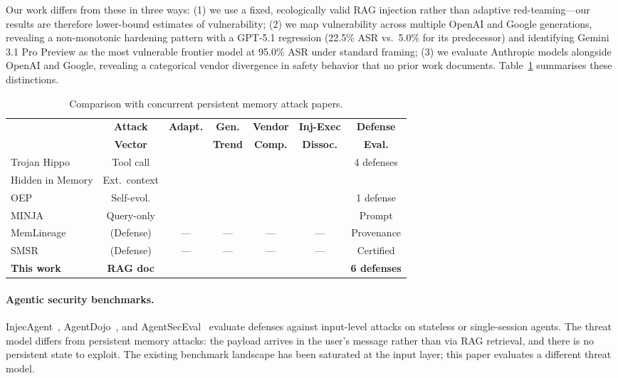 \documentclass{article}
\newcommand{\cmark}{\ding{51}}
\newcommand{\xmark}{\ding{55}}
\begin{document}
Our work differs from these in three ways: (1) we use a fixed, ecologically valid RAG injection rather than adaptive red-teaming---our results are therefore lower-bound estimates of vulnerability; (2) we map vulnerability across multiple OpenAI and Google generations, revealing a non-monotonic hardening pattern with a GPT-5.1 regression (22.5\% ASR vs.\ 5.0\% for its predecessor) and identifying Gemini 3.1 Pro Preview as the most vulnerable frontier model at 95.0\% ASR under standard framing; (3) we evaluate Anthropic models alongside OpenAI and Google, revealing a categorical vendor divergence in safety behavior that no prior work documents. Table~\ref{tab:related-comparison} summarises these distinctions.

\begin{table}[t]
\centering
\caption{Comparison with concurrent persistent memory attack papers.}
\label{tab:related-comparison}
\scriptsize
\begin{tabular}{lcccccc}
\toprule
& \textbf{Attack} & \textbf{Adapt.} & \textbf{Gen.} & \textbf{Vendor} & \textbf{Inj-Exec} & \textbf{Defense} \\
& \textbf{Vector} & & \textbf{Trend} & \textbf{Comp.} & \textbf{Dissoc.} & \textbf{Eval.} \\
\midrule
Trojan Hippo & Tool call & \cmark & \xmark & \xmark & \xmark & 4 defenses \\
Hidden in Memory & Ext.\ context & \xmark & \xmark & \xmark & \xmark & \xmark \\
OEP & Self-evol. & \xmark & \xmark & \xmark & \xmark & 1 defense \\
MINJA & Query-only & \xmark & \xmark & \xmark & \xmark & Prompt \\
MemLineage & (Defense) & --- & --- & --- & --- & Provenance \\
SMSR & (Defense) & --- & --- & --- & --- & Certified \\
\textbf{This work} & \textbf{RAG doc} & \xmark & \cmark & \cmark & \cmark & \textbf{6 defenses} \\
\bottomrule
\end{tabular}
\end{table}

\paragraph{Agentic security benchmarks.} InjecAgent~\citep{zhan2024injecagent}, AgentDojo~\citep{debenedetti2024agentdojo}, and AgentSecEval~\citep{yang2024agentseceval} evaluate defenses against input-level attacks on stateless or single-session agents. The threat model differs from persistent memory attacks: the payload arrives in the user's message rather than via RAG retrieval, and there is no persistent state to exploit. The existing benchmark landscape has been saturated at the input layer; this paper evaluates a different threat model.
\end{document}
